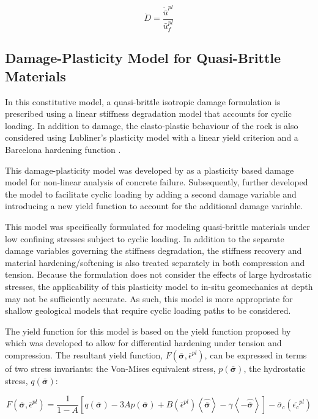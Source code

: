 \begin{equation}
\dot{D}=\frac{\dot{\bar{u}}^{pl}}{\bar{u}_{f}^{pl}}
\label{eqn:druc5}
\end{equation}

\subsection{Damage-Plasticity Model for Quasi-Brittle Materials}

In this constitutive model, a quasi-brittle isotropic damage formulation is prescribed using a linear stiffness degradation model that accounts for cyclic loading. In addition to damage, the elasto-plastic behaviour of the rock is also considered using Lubliner's plasticity model with a linear yield criterion and a Barcelona hardening function \citep{lubliner_plastic-damage_1989}. 

This damage-plasticity model was developed by \citet{lubliner_plastic-damage_1989} as a plasticity based damage model for non-linear analysis of concrete failure. Subsequently, \citet{lee_plastic-damage_1998} further developed the model to facilitate cyclic loading by adding a second damage variable and introducing a new yield function to account for the additional damage variable. 

This model was specifically formulated for modeling quasi-brittle materials under low confining stresses subject to cyclic loading. In addition to the separate damage variables governing the stiffness degradation, the stiffness recovery and material hardening/softening is also treated separately in both compression and tension. Because the formulation does not consider the effects of large hydrostatic stresses, the applicability of this plasticity model to in-situ geomechanics at depth may not be sufficiently accurate. As such, this model is more appropriate for shallow geological models that require cyclic loading paths to be considered.

The yield function for this model is based on the yield function proposed by \citet{lee_plastic-damage_1998} which was developed to allow for differential hardening under tension and compression. The resultant yield function, $F\left(\bar{\boldsymbol{\sigma}},\bar{\epsilon}^{pl}\right)$, can be expressed in terms of two stress invariants: the Von-Mises equivalent stress, $p\left(\bar{\boldsymbol{\sigma}}\right)$, the hydrostatic stress, $q\left(\bar{\boldsymbol{\sigma}}\right)$:

\begin{equation}
    F  \left(\bar{\boldsymbol{\sigma}},\bar{\epsilon}^{pl}\right) =\frac{1}{1-A}
    \left[ q\left(\bar{\boldsymbol{\sigma}}\right)-3A p\left(\bar{\boldsymbol{\sigma}}\right)+B\left(\bar{\epsilon}^{pl}\right)
        \left\langle\hat{\bar{\boldsymbol{\sigma}}}\right\rangle-\gamma\left\langle-\hat{\bar{\boldsymbol{\sigma}}}\right\rangle\right]
    -\bar{\sigma}_{c} \left(\bar{\epsilon_{c}}^{pl}\right)
\label{eqn:const10c}
\end{equation}

